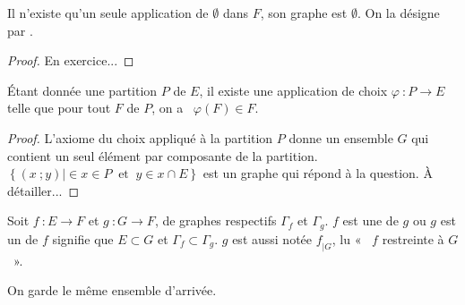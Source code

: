 \begin{theorem}
Il n'existe qu'un seule application de \(∅\) dans \(𝐹\), son graphe est \(∅\).
On la désigne par .
\end{theorem}
\begin{proof}
En exercice...
\end{proof}
%
\begin{theorem}
Étant donnée une partition \(𝑃\) de \(𝐸\),
il existe une application de choix \(𝜑~:𝑃→𝐸\) telle que pour tout \(𝐹\) de
\(𝑃\), on a \ \(𝜑(𝐹)∈𝐹\).
\end{theorem}
\begin{proof}
L'axiome du choix appliqué à la partition \(𝑃\) donne un ensemble \(𝐺\)
qui contient un seul élément par composante de la partition.
\(\left\{(𝑥~;𝑦)\left|∈𝑥∈𝑃~\text{ et }~𝑦∈𝑥∩𝐸\right.\right\}\)
est un graphe qui répond à la question. À détailler...
\end{proof}
%
\begin{definition}
Soit \(𝑓~:𝐸→𝐹\) et \(𝑔~:𝐺→𝐹\), de graphes respectifs \(Γ_{𝑓}\) et \(Γ_{𝑔}\). \(𝑓\) est une
 de \(𝑔\) ou \(𝑔\) est un  de \(𝑓\) signifie
que \(𝐸⊂𝐺\) et \(Γ_{𝑓}⊂Γ_{𝑔}\). \(𝑔\) est aussi notée \(𝑓_{\left|𝐺\right.}\), lu «~ \(𝑓\) restreinte à \(𝐺\)~».
\end{definition}
\begin{remark}
On garde le même ensemble d'arrivée.
\end{remark}
%

